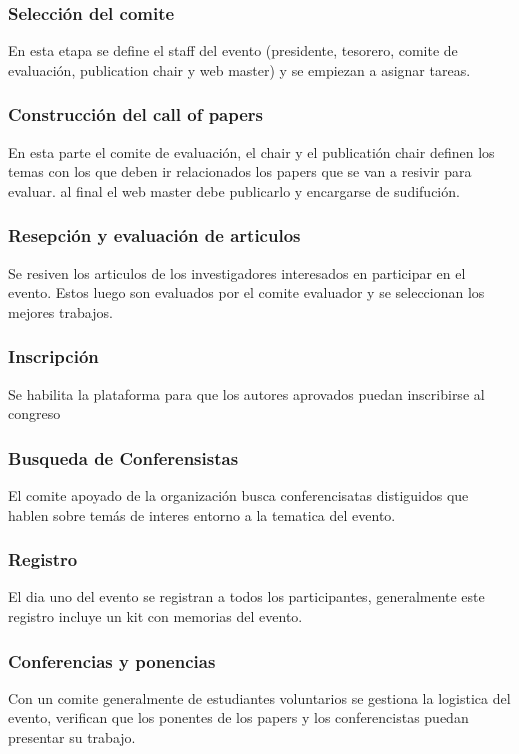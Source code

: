 \subsubsection{Selección del comite}
En esta etapa se define el staff del evento (presidente, tesorero, comite de evaluación, publication chair y web master) y se empiezan a asignar tareas.

\subsubsection{Construcción del call of papers}
En esta parte el comite de evaluación, el chair y el publicatión chair definen los temas con los que deben ir relacionados los papers que se van a resivir para evaluar. al final el web master debe publicarlo y encargarse de sudifución.

\subsubsection{Resepción y evaluación de articulos}
Se resiven los articulos de los investigadores interesados en participar en el evento. Estos luego son evaluados por el comite evaluador y se seleccionan los mejores trabajos. 

\subsubsection{Inscripción}
Se habilita la plataforma para que los autores aprovados puedan inscribirse al congreso

\subsubsection{Busqueda de Conferensistas}
El comite apoyado de la organización busca conferencisatas distiguidos que hablen sobre temás de interes entorno a la tematica del evento.

\subsubsection{Registro}
El dia uno del evento se registran a todos los participantes, generalmente este registro incluye un kit con memorias del evento.

\subsubsection{Conferencias y ponencias}
Con un comite generalmente de estudiantes voluntarios se gestiona la logistica del evento, verifican que los ponentes de los papers y los conferencistas puedan presentar su trabajo.

